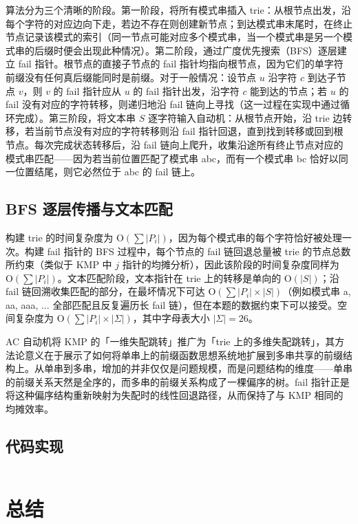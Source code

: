 \documentclass[12pt, a4paper]{academics}
\begin{document}
算法分为三个清晰的阶段。第一阶段，将所有模式串插入 trie：从根节点出发，沿每个字符的对应边向下走，若边不存在则创建新节点；到达模式串末尾时，在终止节点记录该模式的索引（同一节点可能对应多个模式串，当一个模式串是另一个模式串的后缀时便会出现此种情况）。第二阶段，通过广度优先搜索（BFS）逐层建立 fail 指针。根节点的直接子节点的 fail 指针均指向根节点，因为它们的单字符前缀没有任何真后缀能同时是前缀。对于一般情况：设节点 $u$ 沿字符 $c$ 到达子节点 $v$，则 $v$ 的 fail 指针应从 $u$ 的 fail 指针出发，沿字符 $c$ 能到达的节点；若 $u$ 的 fail 没有对应的字符转移，则递归地沿 fail 链向上寻找（这一过程在实现中通过循环完成）。第三阶段，将文本串 $S$ 逐字符输入自动机：从根节点开始，沿 trie 边转移，若当前节点没有对应的字符转移则沿 fail 指针回退，直到找到转移或回到根节点。每次完成状态转移后，沿 fail 链向上爬升，收集沿途所有终止节点对应的模式串匹配——因为若当前位置匹配了模式串 abc，而有一个模式串 bc 恰好以同一位置结尾，则它必然位于 abc 的 fail 链上。

\subsection{BFS 逐层传播与文本匹配}

构建 trie 的时间复杂度为 $\mathrm{O}(\sum |P_i|)$，因为每个模式串的每个字符恰好被处理一次。构建 fail 指针的 BFS 过程中，每个节点的 fail 链回退总量被 trie 的节点总数所约束（类似于 KMP 中 $j$ 指针的均摊分析），因此该阶段的时间复杂度同样为 $\mathrm{O}(\sum |P_i|)$。文本匹配阶段，文本指针在 trie 上的转移是单向的 $\mathrm{O}(|S|)$；沿 fail 链回溯收集匹配的部分，在最坏情况下可达 $\mathrm{O}(\sum |P_i| \times |S|)$（例如模式串 a, aa, aaa, $\dots$ 全部匹配且反复遍历长 fail 链），但在本题的数据约束下可以接受。空间复杂度为 $\mathrm{O}(\sum |P_i| \times |\Sigma|)$，其中字母表大小 $|\Sigma| = 26$。

AC 自动机将 KMP 的「一维失配跳转」推广为「trie 上的多维失配跳转」，其方法论意义在于展示了如何将单串上的前缀函数思想系统地扩展到多串共享的前缀结构上。从单串到多串，增加的并非仅仅是问题规模，而是问题结构的维度——单串的前缀关系天然是全序的，而多串的前缀关系构成了一棵偏序的树。fail 指针正是将这种偏序结构重新映射为失配时的线性回退路径，从而保持了与 KMP 相同的均摊效率。

\subsection{代码实现}

\inputminted{c++}{../src/p4_ac.cpp}

\section{总结}
\end{document}
